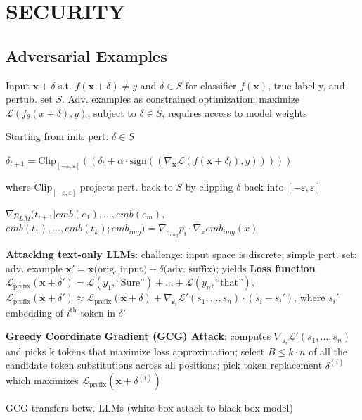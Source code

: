 \section{SECURITY}

\subsection{Adversarial Examples}
 Input $\mathbf{x} + \delta$ s.t. $f (\mathbf{x} + \delta) \neq y$ and $\delta \in S$ for classifier $f(\mathbf{x})$, true label y, and pertub. set $S$.
\comment Adv. examples as constrained optimization: maximize $\mathcal{L}(f_\theta(x+\delta),y)$, subject to $\delta\in S$, requires access to model weights

 Starting from init. pert. $\delta\in S$

$\delta_{t+1} = \text{Clip}_{[-\varepsilon, \varepsilon]} ((\delta_t + \alpha \cdot \text{sign} ((\nabla_\mathbf{x} \mathcal{L}(f(\mathbf{x} + \delta_t), y)))))$

where $\text{Clip}_{[-\varepsilon, \varepsilon]}$ projects pert. back to $S$ by clipping $\delta$ back into $[-\varepsilon, \varepsilon]$

\example $\nabla p_{LM}(t_{i+1}|emb(e_1),\dots,emb(e_m),$\\
$emb(t_1),\dots,emb(t_k);emb_{img})=\nabla_{e_{img}}p_i\cdot \nabla_x emb_{img} (x)$

\textbf{Attacking text-only LLMs}: challenge: input space is discrete; simple pert. set: adv. example $\mathbf{x}' = \mathbf{x} \text{(orig. input)} + \delta \text{(adv. suffix)}$; yields \textbf{Loss function} $\mathcal{L}_{\text{prefix}}(\mathbf{x}+\delta') = \mathcal{L}(y_1, \text{``Sure''}) + \dots + \mathcal{L}(y_n, \text{``that''})$, $\mathcal{L}_{\text{prefix}}(\mathbf{x}+\delta') \approx \mathcal{L}_{\text{prefix}}(\mathbf{x}+\delta) + \nabla_{\mathbf{s}_i}\mathcal{L}'(s_1, \dots, s_n) \cdot (s_i - s_i')$, where $s_i'$ embedding of $i^{\text{th}}$ token in $\delta'$

\textbf{Greedy Coordinate Gradient (GCG) Attack}: computes $\nabla_{\mathbf{s}_i}\mathcal{L}'(s_1, \dots, s_n)$ and picks k tokens that maximize loss approximation; select $B \leq k·n$ of all the candidate token substitutions across all positions; pick token replacement $\delta^{(i)}$ which maximizes $\mathcal{L}_{\text{prefix}}(\mathbf{x}+\delta^{(i)}) $

\comment GCG transfers betw. LLMs (white-box attack to black-box model)


